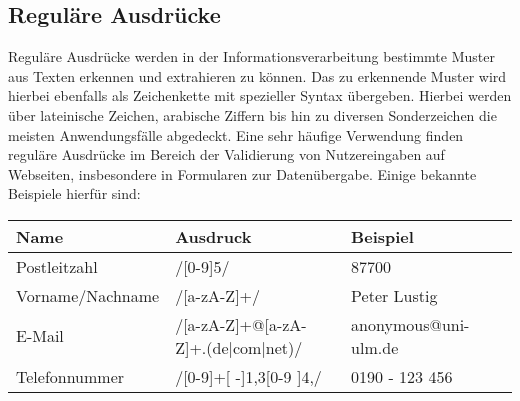 \subsection{Reguläre Ausdrücke	}
Reguläre Ausdrücke werden in der Informationsverarbeitung bestimmte Muster aus Texten erkennen und extrahieren zu können. Das zu erkennende Muster wird hierbei ebenfalls als Zeichenkette mit spezieller Syntax übergeben. Hierbei werden über lateinische Zeichen, arabische Ziffern bis hin zu diversen Sonderzeichen die meisten Anwendungsfälle abgedeckt.
Eine sehr häufige Verwendung finden reguläre Ausdrücke im Bereich der Validierung von Nutzereingaben auf Webseiten, insbesondere in Formularen zur Datenübergabe. Einige bekannte Beispiele hierfür sind:
\newline
\begin{tabular}{llll}
\hline
Name & Ausdruck & Beispiel \\
\hline
Postleitzahl & /[0-9]{5}/ & 87700 \\
Vorname/Nachname & /[a-zA-Z]+/ & Peter Lustig \\
E-Mail & /[a-zA-Z]+@[a-zA-Z]+.(de|com|net)/ & anonymous@uni-ulm.de \\
Telefonnummer & /[0-9]+[ -]{1,3}[0-9 ]{4,}/ & 0190 - 123 456 \\
\hline
\end{tabular}

